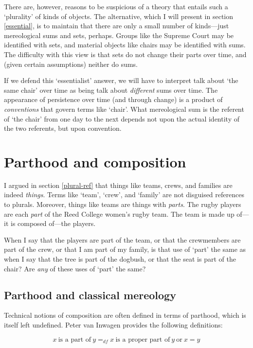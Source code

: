 \documentclass[11pt]{article}
\begin{document}
\begin{spacing}{1.5}
There are, however, reasons to be suspicious of a theory that entails
such a `plurality' of kinds of objects.  The alternative, which I will
present in section \ref{essential}, is to maintain that there are only
a small number of kinds---just mereological sums and sets, perhaps.
Groups like the Supreme Court may be identified with sets, and
material objects like chairs may be identified with sums.  The
difficulty with this view is that sets do not change their parts over
time, and (given certain assumptions) neither do sums.

If we defend this `essentialist' answer, we will have to interpret
talk about `the same chair' over time as being talk about {\em
  different} sums over time.  The appearance of persistence over time
(and through change) is a product of {\em conventions} that govern
terms like `chair'.  What mereological sum is the referent of `the
chair' from one day to the next depends not upon the actual identity
of the two referents, but upon convention.

\section{Parthood and composition}
\label{parthood}
I argued in section \ref{plural-ref} that things like teams, crews,
and families are indeed {\em things}.  Terms like `team', `crew', and
`family' are not disguised references to plurals.  Moreover, things
like teams are things with {\em parts}.  The rugby players are each
{\em part} of the Reed College women's rugby team.  The team is made
up of---it is composed of---the players.

When I say that the players are part of the team, or that the
crewmembers are part of the crew, or that I am part of my family, is
that use of `part' the same as when I say that the tree is part of the
dogbush, or that the seat is part of the chair?  Are {\em any} of
these uses of `part' the same?

\subsection{Parthood and classical mereology}
\label{tech}
Technical notions of composition are often defined in terms of
parthood, which is itself left undefined.  Peter van Inwagen provides
the following definitions:

\begin{displaymath}
x\ \text{is a part of}\ y =_{df} x\ \text{is a proper part
  of}\ y\ \text{or}\ x = y
\end{displaymath}


\end{spacing}
\end{document}
